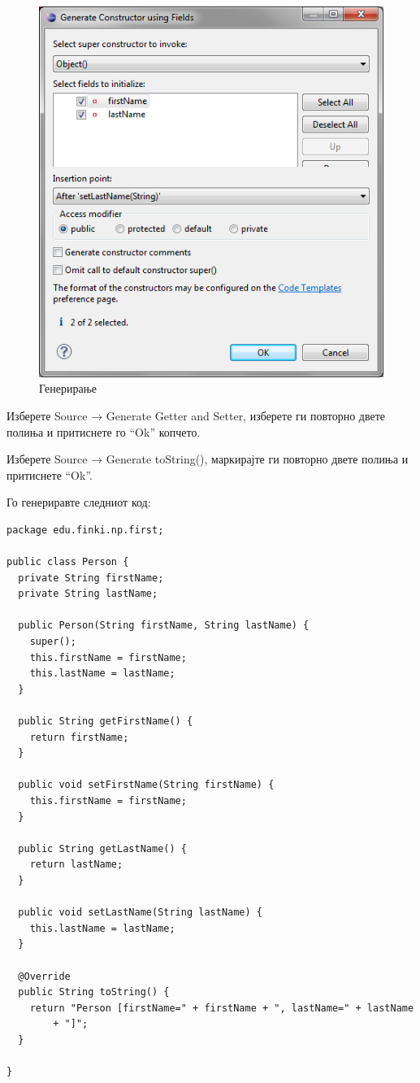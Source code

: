 \begin{figure}
\centering
\includegraphics[scale=.5]{images/generate}
\caption{Генерирање}
\end{figure}

Изберете Source → Generate Getter and Setter, изберете ги повторно двете
полиња и притиснете го ``Ok'' копчето.

Изберете Source → Generate toString(), маркирајте ги повторно двете полиња и
притиснете ``Ok''.

Го генериравте следниот код:

\begin{lstlisting}
package edu.finki.np.first;

public class Person {
  private String firstName;
  private String lastName;

  public Person(String firstName, String lastName) {
    super();
    this.firstName = firstName;
    this.lastName = lastName;
  }

  public String getFirstName() {
    return firstName;
  }

  public void setFirstName(String firstName) {
    this.firstName = firstName;
  }

  public String getLastName() {
    return lastName;
  }

  public void setLastName(String lastName) {
    this.lastName = lastName;
  }

  @Override
  public String toString() {
    return "Person [firstName=" + firstName + ", lastName=" + lastName
        + "]";
  }

} 
\end{lstlisting}

